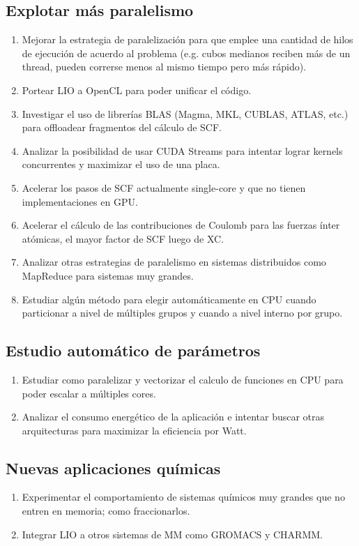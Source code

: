 \subsection*{Explotar m\'as paralelismo}
\begin{enumerate}
  \item Mejorar la estrategia de paralelizaci\'on para que emplee una cantidad de
  hilos de ejecuci\'on de acuerdo al problema (e.g. cubos medianos reciben m\'as
  de un thread, pueden correrse menos al mismo tiempo pero m\'as r\'apido).
  \item Portear LIO a OpenCL para poder unificar el c\'odigo.
  \item Investigar el uso de librer\'ias BLAS (Magma, MKL, CUBLAS, ATLAS, etc.) para offloadear fragmentos del
    c\'alculo de SCF.
  \item Analizar la posibilidad de usar CUDA Streams para intentar lograr kernels concurrentes y maximizar
    el uso de una placa.
  \item Acelerar los pasos de SCF actualmente single-core y que no tienen implementaciones en GPU.
  \item Acelerar el c\'alculo de las contribuciones de Coulomb para las fuerzas \'inter at\'omicas, el mayor factor de SCF luego de XC.
  \item Analizar otras estrategias de paralelismo en sistemas distribuidos como MapReduce para sistemas muy grandes.
  \item Estudiar alg\'un m\'etodo para elegir autom\'aticamente en CPU cuando particionar a nivel
    de m\'ultiples grupos y cuando a nivel interno por grupo.
\end{enumerate}

\subsection*{Estudio autom\'atico de par\'ametros}
\begin{enumerate}
  \item Estudiar como paralelizar y vectorizar el calculo de funciones en CPU para poder escalar a m\'ultiples cores.
  \item Analizar el consumo energ\'etico de la aplicaci\'on e intentar buscar otras arquitecturas para maximizar
    la eficiencia por Watt.
\end{enumerate}

\subsection*{Nuevas aplicaciones qu\'imicas}
\begin{enumerate}
  \item Experimentar el comportamiento de sistemas qu\'imicos muy grandes que no entren en memoria; como fraccionarlos.
  \item Integrar LIO a otros sistemas de MM como GROMACS y CHARMM.
\end{enumerate}
